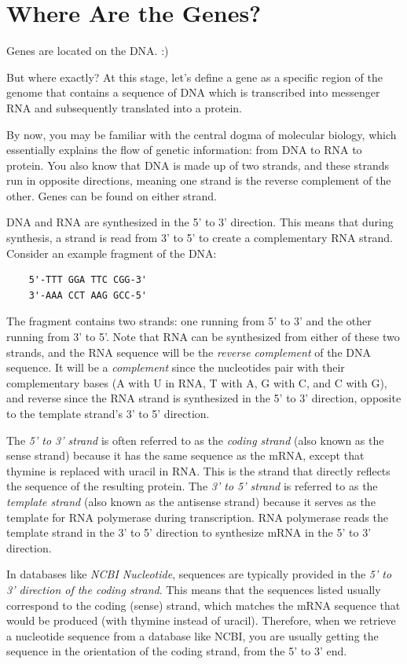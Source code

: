 \chapter{Where Are the Genes?}
\label{ch:genes}

Genes are located on the DNA. :)

But where exactly? At this stage, let's define a gene as a specific region of the genome that contains a sequence of DNA which is transcribed into messenger RNA and subsequently translated into a protein.

By now, you may be familiar with the central dogma of molecular biology, which essentially explains the flow of genetic information: from DNA to RNA to protein. You also know that DNA is made up of two strands, and these strands run in opposite directions, meaning one strand is the reverse complement of the other. Genes can be found on either strand.

DNA and RNA are synthesized in the 5' to 3' direction. This means that during synthesis, a strand is read from 3' to 5' to create a complementary RNA strand. Consider an example fragment of the DNA:

\begin{verbatim}
    5'-TTT GGA TTC CGG-3'
    3'-AAA CCT AAG GCC-5'
\end{verbatim}

The fragment contains two strands: one running from 5' to 3' and the other running from 3' to 5'. Note that RNA can be synthesized from either of these two strands, and the RNA sequence will be the {\em reverse complement} of the DNA sequence. It will be a {\em complement} since the nucleotides pair with their complementary bases (A with U in RNA, T with A, G with C, and C with G), and reverse since the RNA strand is synthesized in the 5' to 3' direction, opposite to the template strand's 3' to 5' direction.

The {\em 5' to 3' strand} is often referred to as the {\em coding strand} (also known as the sense strand) because it has the same sequence as the mRNA, except that thymine is replaced with uracil in RNA. This is the strand that directly reflects the sequence of the resulting protein. The {\em 3' to 5' strand} is referred to as the {\em template strand} (also known as the antisense strand) because it serves as the template for RNA polymerase during transcription. RNA polymerase reads the template strand in the 3' to 5' direction to synthesize mRNA in the 5' to 3' direction.

In databases like {\em NCBI Nucleotide}, sequences are typically provided in the {\em 5' to 3' direction of the coding strand}. This means that the sequences listed usually correspond to the coding (sense) strand, which matches the mRNA sequence that would be produced (with thymine instead of uracil). Therefore, when we retrieve a nucleotide sequence from a database like NCBI, you are usually getting the sequence in the orientation of the coding strand, from the 5' to 3' end.

